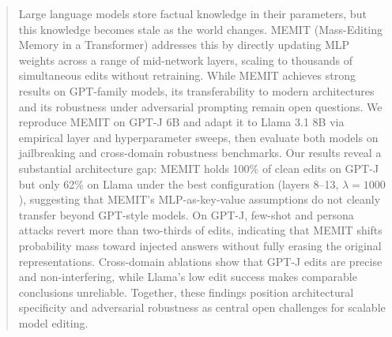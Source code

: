 %


\begin{abstract}
Large language models store factual knowledge in their parameters, but this knowledge becomes stale as the world changes. MEMIT (Mass-Editing Memory in a Transformer) addresses this by directly updating MLP weights across a range of mid-network layers, scaling to thousands of simultaneous edits without retraining. While MEMIT achieves strong results on GPT-family models, its transferability to modern architectures and its robustness under adversarial prompting remain open questions. We reproduce MEMIT on GPT-J 6B and adapt it to Llama 3.1 8B via empirical layer and hyperparameter sweeps, then evaluate both models on jailbreaking and cross-domain robustness benchmarks. Our results reveal a substantial architecture gap: MEMIT holds 100\% of clean edits on GPT-J but only 62\% on Llama under the best configuration (layers 8--13, $\lambda{=}1000$), suggesting that MEMIT's MLP-as-key-value assumptions do not cleanly transfer beyond GPT-style models. On GPT-J, few-shot and persona attacks revert more than two-thirds of edits, indicating that MEMIT shifts probability mass toward injected answers without fully erasing the original representations. Cross-domain ablations show that GPT-J edits are precise and non-interfering, while Llama's low edit success makes comparable conclusions unreliable. Together, these findings position architectural specificity and adversarial robustness as central open challenges for scalable model editing.
\end{abstract}


